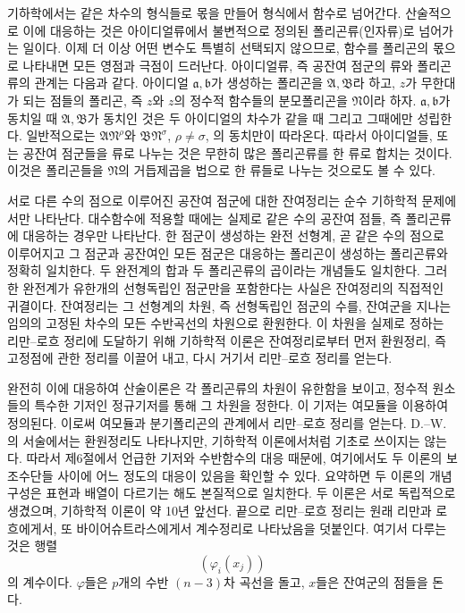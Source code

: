 기하학에서는 같은 차수의 형식들로 몫을 만들어 형식에서 함수로 넘어간다. 산술적으로 이에 대응하는 것은 아이디얼류에서 불변적으로 정의된 폴리곤류(인자류)로 넘어가는 일이다. 이제 더 이상 어떤 변수도 특별히 선택되지 않으므로, 함수를 폴리곤의 몫으로 나타내면 모든 영점과 극점이 드러난다. 아이디얼류, 즉 공잔여 점군의 류와 폴리곤류의 관계는 다음과 같다. 아이디얼 \(\mathfrak a,\mathfrak b\)가 생성하는 폴리곤을 \(\mathfrak A,\mathfrak B\)라 하고, \(z\)가 무한대가 되는 점들의 폴리곤, 즉 \(z\)와 \(z\)의 정수적 함수들의 분모폴리곤을 \(\mathfrak N\)이라 하자. \(\mathfrak a,\mathfrak b\)가 동치일 때 \(\mathfrak A,\mathfrak B\)가 동치인 것은 두 아이디얼의 차수가 같을 때 그리고 그때에만 성립한다. 일반적으로는 \(\mathfrak A\mathfrak N^\rho\)와 \(\mathfrak B\mathfrak N^\sigma\), \(\rho\ne\sigma\), 의 동치만이 따라온다. 따라서 아이디얼들, 또는 공잔여 점군들을 류로 나누는 것은 무한히 많은 폴리곤류를 한 류로 합치는 것이다. 이것은 폴리곤들을 \(\mathfrak N\)의 거듭제곱을 법으로 한 류들로 나누는 것으로도 볼 수 있다.

서로 다른 수의 점으로 이루어진 공잔여 점군에 대한 잔여정리는 순수 기하학적 문제에서만 나타난다. 대수함수에 적용할 때에는 실제로 같은 수의 공잔여 점들, 즉 폴리곤류에 대응하는 경우만 나타난다. 한 점군이 생성하는 \glqq{}완전 선형계\grqq{}, 곧 같은 수의 점으로 이루어지고 그 점군과 공잔여인 모든 점군은 대응하는 폴리곤이 생성하는 폴리곤류와 정확히 일치한다. \glqq{}두 완전계의 합\grqq{}과 \glqq{}두 폴리곤류의 곱\grqq{}이라는 개념들도 일치한다. 그러한 완전계가 유한개의 선형독립인 점군만을 포함한다는 사실은 잔여정리의 직접적인 귀결이다. 잔여정리는 그 선형계의 차원, 즉 선형독립인 점군의 수를, 잔여군을 지나는 임의의 고정된 차수의 모든 수반곡선의 차원으로 환원한다. 이 차원을 실제로 정하는 리만--로흐 정리에 도달하기 위해 기하학적 이론은 잔여정리로부터 먼저 \glqq{}환원정리\grqq{}, 즉 고정점에 관한 정리를 이끌어 내고, 다시 거기서 리만--로흐 정리를 얻는다.

완전히 이에 대응하여 산술이론은 각 폴리곤류의 차원이 유한함을 보이고, 정수적 원소들의 특수한 기저인 정규기저를 통해 그 차원을 정한다. 이 기저는 여모듈을 이용하여 정의된다. 이로써 여모듈과 분기폴리곤의 관계에서 리만--로흐 정리를 얻는다. D.--W.의 서술에서는 환원정리도 나타나지만, 기하학적 이론에서처럼 기초로 쓰이지는 않는다. 따라서 제6절에서 언급한 기저와 수반함수의 대응 때문에, 여기에서도 두 이론의 보조수단들 사이에 어느 정도의 대응이 있음을 확인할 수 있다. 요약하면 두 이론의 개념 구성은 표현과 배열이 다르기는 해도 본질적으로 일치한다. 두 이론은 서로 독립적으로 생겼으며, 기하학적 이론이 약 10년 앞선다. 끝으로 리만--로흐 정리는 원래 리만과 로흐에게서, 또 바이어슈트라스에게서 계수정리로 나타났음을 덧붙인다. 여기서 다루는 것은 행렬
\[
(\varphi_i(x_j))
\]
의 계수이다. \(\varphi\)들은 \(p\)개의 수반 \((n-3)\)차 곡선을 돌고, \(x\)들은 잔여군의 점들을 돈다.

